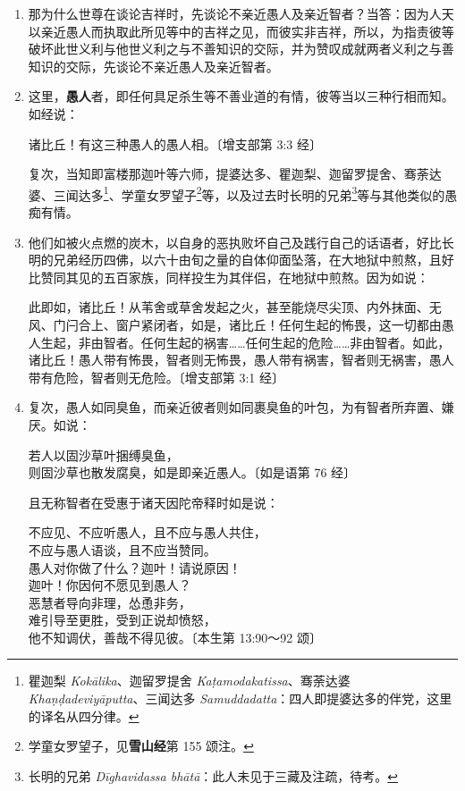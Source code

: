 \begin{enumerate}
\item 那为什么世尊在谈论吉祥时，先谈论不亲近愚人及亲近智者？当答：因为人天以亲近愚人而执取此所见等中的吉祥之见，而彼实非吉祥，所以，为指责彼等破坏此世义利与他世义利之与不善知识的交际，并为赞叹成就两者义利之与善知识的交际，先谈论不亲近愚人及亲近智者。
\item 这里，\textbf{愚人}者，即任何具足杀生等不善业道的有情，彼等当以三种行相而知。如经说：\begin{quoting}诸比丘！有这三种愚人的愚人相。{\bluefootnotesize 〔增支部第 3:3 经〕}\end{quoting}复次，当知即富楼那迦叶等六师，提婆达多、瞿迦梨、迦留罗提舍、骞荼达婆、三闻达多\footnote{瞿迦梨 \textit{Kokālika}、迦留罗提舍 \textit{Kaṭamodakatissa}、骞荼达婆 \textit{Khaṇḍadeviyāputta}、三闻达多 \textit{Samuddadatta}：四人即提婆达多的伴党，这里的译名从四分律。}、学童女罗望子\footnote{学童女罗望子，见\textbf{雪山经}第 155 颂注。}等，以及过去时长明的兄弟\footnote{长明的兄弟 \textit{Dīghavidassa bhātā}：此人未见于三藏及注疏，待考。}等与其他类似的愚痴有情。
\item 他们如被火点燃的炭木，以自身的恶执败坏自己及践行自己的话语者，好比长明的兄弟经历四佛，以六十由旬之量的自体仰面坠落，在大地狱中煎熬，且好比赞同其见的五百家族，同样投生为其伴侣，在地狱中煎熬。因为如说：\begin{quoting}此即如，诸比丘！从苇舍或草舍发起之火，甚至能烧尽尖顶、内外抹面、无风、门闩合上、窗户紧闭者，如是，诸比丘！任何生起的怖畏，这一切都由愚人生起，非由智者。任何生起的祸害……任何生起的危险……非由智者。如此，诸比丘！愚人带有怖畏，智者则无怖畏，愚人带有祸害，智者则无祸害，愚人带有危险，智者则无危险。{\bluefootnotesize 〔增支部第 3:1 经〕}\end{quoting}
\item 复次，愚人如同臭鱼，而亲近彼者则如同裹臭鱼的叶包，为有智者所弃置、嫌厌。如说：\begin{quoting}若人以固沙草叶捆缚臭鱼，\\则固沙草也散发腐臭，如是即亲近愚人。{\bluefootnotesize 〔如是语第 76 经〕}\end{quoting}且无称智者在受惠于诸天因陀帝释时如是说：\begin{quoting}不应见、不应听愚人，且不应与愚人共住，\\不应与愚人语谈，且不应当赞同。\\愚人对你做了什么？迦叶！请说原因！\\迦叶！你因何不愿见到愚人？\\恶慧者导向非理，怂恿非务，\\难引导至更胜，受到正说却愤怒，\\他不知调伏，善哉不得见彼。{\bluefootnotesize 〔本生第 13:90～92 颂〕}\end{quoting}

\end{enumerate}
